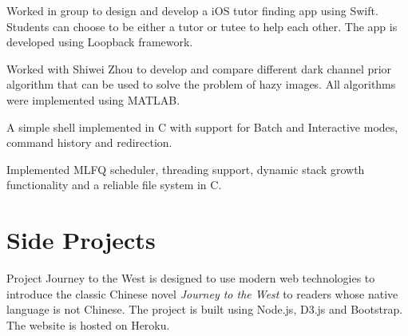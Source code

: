 \documentclass[]{deedy-resume-openfont}
\begin{document}
\begin{minipage}[t]{0.66\textwidth}
\descript{}
Worked in group to design and develop a iOS tutor finding app using Swift. Students can choose to be either a tutor or tutee to help each other. The app is developed using Loopback framework.
\sectionsep

\descript{}
Worked with Shiwei Zhou to develop and compare different dark channel prior algorithm that can be used to solve the problem of hazy images. All algorithms were implemented using MATLAB.
\sectionsep

\descript{}
A simple shell implemented in C with support for Batch and Interactive modes, command history and redirection.
\sectionsep

\descript{}
Implemented MLFQ scheduler, threading support, dynamic stack growth functionality and a reliable file system in C.
\sectionsep

\section{Side Projects}
\descript{}
Project Journey to the West is designed to use modern web technologies to introduce the classic Chinese novel \textit{Journey to the West} to readers whose native language is not Chinese. The project is built using Node.js, D3.js and Bootstrap. The website is hosted on Heroku.
\iffalse
\section{Volunteer}
\runsubsection{American Red Cross}
\descript{| Data Entry Volunteer }
\location{Sep 2013 - Sep 2016 | Madison, WI}
\begin{tightemize}
\item Process and enter donation information into Red Cross database
\item Generate acknowledgment letters and communicate with donors 
\end{tightemize}
\sectionsep
\fi

\end{minipage} 
\end{document}

